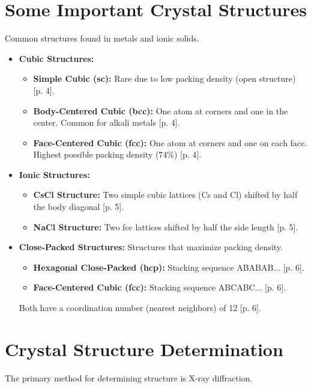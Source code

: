\documentclass[a4paper,oneside,article]{memoir}
\begin{document}
\section{Some Important Crystal Structures}
Common structures found in metals and ionic solids.
\begin{itemize}
    \item \textbf{Cubic Structures:}
    \begin{itemize}
        \item \textbf{Simple Cubic (sc):} Rare due to low packing density (open structure) [p. 4].
        \item \textbf{Body-Centered Cubic (bcc):} One atom at corners and one in the center. Common for alkali metals [p. 4].
        \item \textbf{Face-Centered Cubic (fcc):} One atom at corners and one on each face. Highest possible packing density (74\%) [p. 4].
    \end{itemize}
    \item \textbf{Ionic Structures:}
    \begin{itemize}
        \item \textbf{CsCl Structure:} Two simple cubic lattices (Cs and Cl) shifted by half the body diagonal [p. 5].
        \item \textbf{NaCl Structure:} Two fcc lattices shifted by half the side length [p. 5].
    \end{itemize}
    \item \textbf{Close-Packed Structures:} Structures that maximize packing density.
    \begin{itemize}
        \item \textbf{Hexagonal Close-Packed (hcp):} Stacking sequence ABABAB... [p. 6].
        \item \textbf{Face-Centered Cubic (fcc):} Stacking sequence ABCABC... [p. 6].
    \end{itemize}
    Both have a coordination number (nearest neighbors) of 12 [p. 6].
\end{itemize}

\section{Crystal Structure Determination}
The primary method for determining structure is X-ray diffraction.
\end{document}
